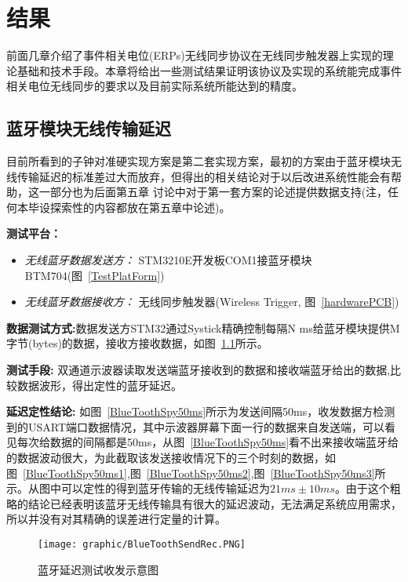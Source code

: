 \chapter{结\quad 果}

	前面几章介绍了事件相关电位(ERPs)无线同步协议在无线同步触发器上实现的理论基础和技术手段。本章将给出一些测试结果证明该协议及实现的系统能完成事件相关电位无线同步的要求以及目前实际系统所能达到的精度。

\section{蓝牙模块无线传输延迟\label{sec:bluetooResult}}

	目前所看到的子钟对准硬实现方案是第二套实现方案，最初的方案由于蓝牙模块无线传输延迟的标准差过大而放弃，但得出的相关结论对于以后改进系统性能会有帮助，这一部分也为后面第五章 讨论中对于第一套方案的论述提供数据支持(注，任何本毕设探索性的内容都放在第五章中论述)。

\textbf{测试平台：}
\begin{itemize}
\item \textsl{无线蓝牙数据发送方：} STM3210E开发板COM1接蓝牙模块BTM704(图~\ref{TestPlatForm})
\item \textsl{无线蓝牙数据接收方：} 无线同步触发器(Wireless Trigger, 图~\ref{hardwarePCB})
\end{itemize}

\textbf{数据测试方式:}数据发送方STM32通过Systick精确控制每隔N ms给蓝牙模块提供M 字节(bytes)的数据，接收方接收数据，如图~\ref{WirelessTest}所示。

\textbf{测试手段:} 双通道示波器读取发送端蓝牙接收到的数据和接收端蓝牙给出的数据,比较数据波形，得出定性的蓝牙延迟。

\textbf{延迟定性结论:} 如图~\ref{BlueToothSpy50ms}所示为发送间隔50ms，收发数据方检测到的USART端口数据情况，其中示波器屏幕下面一行的数据来自发送端，可以看见每次给数据的间隔都是50ms，从图~\ref{BlueToothSpy50ms}看不出来接收端蓝牙给的数据波动很大，为此截取该发送接收情况下的三个时刻的数据，如图~\ref{BlueToothSpy50ms1},图~\ref{BlueToothSpy50ms2},图~\ref{BlueToothSpy50ms3}所示。从图中可以定性的得到蓝牙传输的无线传输延迟为$21ms\pm 10ms$。由于这个粗略的结论已经表明该蓝牙无线传输具有很大的延迟波动，无法满足系统应用需求，所以并没有对其精确的误差进行定量的计算。

\begin{figure}[!hbp]
\begin{center}
\texttt{[image: graphic/BlueToothSendRec.PNG]}
\caption{蓝牙延迟测试收发示意图 \label{WirelessTest}}
\end{center}
\end{figure}


